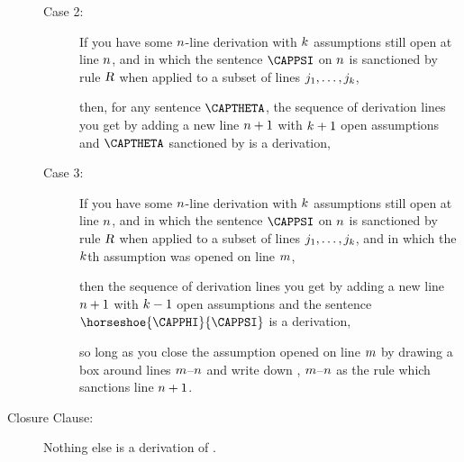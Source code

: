 \begin{majorILnc}{}
\begin{description}
\begin{description}
\item[Case 2:] If you have some $n$-line derivation with $k$ assumptions still open at line $n$, and in which the sentence $\CAPPSI$ on $n$ is sanctioned by rule $\textsl{R}$ when applied to a subset of lines $j_1,\ldots,j_k$, 
\begin{gproofnn}
\glinend{}{}{}
\glinend{}{$\qquad\vdots$}{}
\glinend{}{}{}
\end{gproofnn}
then, for any sentence $\CAPTHETA$, the sequence of derivation lines you get by adding a new line $n+1$ with $k+1$ open assumptions and $\CAPTHETA$ sanctioned by  is a derivation,
\begin{gproofnn}
\glinend{}{}{}
\glinend{}{$\qquad\vdots$}{}
\glinend{}{}{}
\end{gproofnn}

\item[Case 3:] If you have some $n$-line derivation with $k$ assumptions still open at line $n$, and in which the sentence $\CAPPSI$ on $n$ is sanctioned by rule $\textsl{R}$ when applied to a subset of lines $j_1,\ldots,j_k$, and in which the $k$th assumption was opened on line $m$, 
\begin{gproofnn}
\glinend{}{}{}
\glinend{}{$\qquad\vdots$}{}
\glinend{}{}{}
\galineNCnd{}{}{}
\galineNCnd{}{$\qquad\vdots$}{}
\galineNCnd{}{}{}
\end{gproofnn}
then the sequence of derivation lines you get by adding a new line $n+1$ with $k-1$ open assumptions and the sentence $\horseshoe{\CAPPHI}{\CAPPSI}$ is a derivation,
\begin{gproofnn}
\glinend{}{}{}
\glinend{}{$\qquad\vdots$}{}
\glinend{}{}{}
\end{gproofnn}
so long as you close the assumption opened on line $m$ by drawing a box around lines $m$--$n$ and write down , $m$--$n$ as the rule which sanctions line $n+1$. 
\end{description}

\item[Closure Clause:] Nothing else is a derivation of \GSL{}.
\end{description}
\end{majorILnc}
